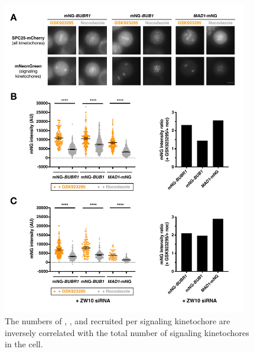 \begin{figure}
    \centering
    \includegraphics[width=0.95\textwidth]{chapters/figures/SACProteinKinetochoreRecruitment.pdf}
    \caption{The numbers of , , and  recruited per signaling kinetochore are inversely correlated with the total number of signaling kinetochores in the cell.}
    \label{SACProteinKinetochoreRecruitment}
\end{figure}

